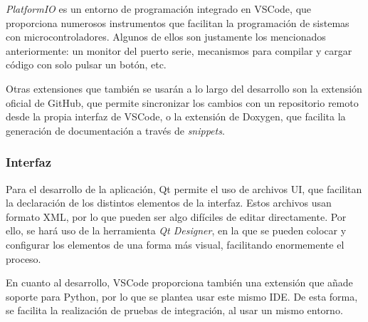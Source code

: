 \textit{PlatformIO} es un entorno de programación integrado en VSCode, que proporciona numerosos instrumentos que facilitan la programación de sistemas con microcontroladores. Algunos de ellos son justamente los mencionados anteriormente: un monitor del puerto serie, mecanismos para compilar y cargar código con solo pulsar un botón, etc.

Otras extensiones que también se usarán a lo largo del desarrollo son la extensión oficial de GitHub, que permite sincronizar los cambios con un repositorio remoto desde la propia interfaz de VSCode, o la extensión de Doxygen, que facilita la generación de documentación a través de \textit{snippets}.

\subsubsection{Interfaz}

Para el desarrollo de la aplicación, Qt permite el uso de archivos UI, que facilitan la declaración de los distintos elementos de la interfaz. Estos archivos usan formato XML, por lo que pueden ser algo difíciles de editar directamente. Por ello, se hará uso de la herramienta \textit{Qt Designer}, en la que se pueden colocar y configurar los elementos de una forma más visual, facilitando enormemente el proceso.

En cuanto al desarrollo, VSCode proporciona también una extensión que añade soporte para Python, por lo que se plantea usar este mismo IDE. De esta forma, se facilita la realización de pruebas de integración, al usar un mismo entorno.
